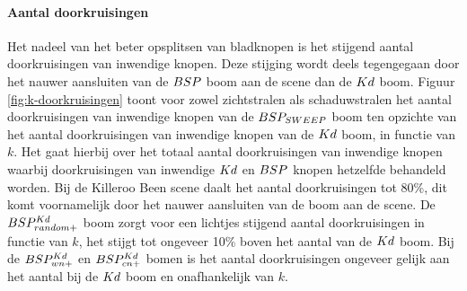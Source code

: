 \begin{figure}
  \centering
  
\end{figure}

\paragraph{Aantal doorkruisingen}
Het nadeel van het beter opsplitsen van bladknopen is het stijgend aantal doorkruisingen van inwendige knopen.
Deze stijging wordt deels tegengegaan door het nauwer aansluiten van de $BSP$ boom aan de scene dan de $Kd$ boom.
Figuur \ref{fig:k-doorkruisingen} toont voor zowel zichtstralen als schaduwstralen het aantal doorkruisingen van inwendige knopen van de $BSP_{SWEEP}$ boom ten opzichte van het aantal doorkruisingen van inwendige knopen van de $Kd$ boom, in functie van $k$.
Het gaat hierbij over het totaal aantal doorkruisingen van inwendige knopen waarbij doorkruisingen van inwendige $Kd$ en $BSP$ knopen hetzelfde behandeld worden. 
Bij de Killeroo Been scene daalt het aantal doorkruisingen tot 80\%, dit komt voornamelijk door het nauwer aansluiten van de boom aan de scene.
De $BSP^{Kd}_{random+}$ boom zorgt voor een lichtjes stijgend aantal doorkruisingen in functie van $k$, het stijgt tot ongeveer 10\% boven het aantal van de $Kd$ boom.
Bij de $BSP^{Kd}_{wn+}$ en $BSP^{Kd}_{cn+}$ bomen is het aantal doorkruisingen ongeveer gelijk aan het aantal bij de $Kd$ boom en onafhankelijk van $k$.
